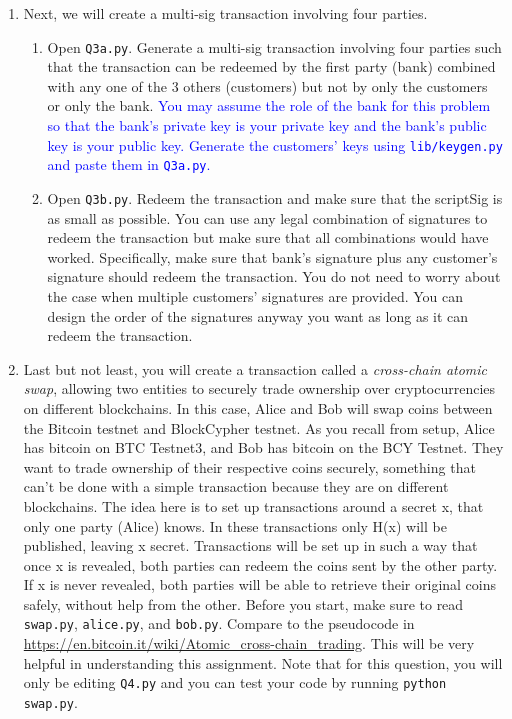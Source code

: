 \documentclass[11pt]{article}
\newenvironment{problems}
{\begin{enumerate}[label=\bfseries Exercise \arabic*.,align=left]}
{\end{enumerate}}
\begin{document}
\begin{problems}
\item Next, we will create a multi-sig transaction involving four parties.
    \begin{enumerate}
        \item Open \texttt{Q3a.py}. Generate a multi-sig transaction involving four parties such that the transaction can be redeemed by the first party (bank) combined with any one of the 3 others (customers) but not by only the customers or only the bank. \textcolor{blue}{You may assume the role of the bank for this problem so that the bank's private key is your private key and the bank's public key is your public key. Generate the customers' keys using \texttt{lib/keygen.py} and paste them in \texttt{Q3a.py}.}
        \item Open \texttt{Q3b.py}. Redeem the transaction and make sure that the scriptSig is as small as possible. You can use any legal combination of signatures to redeem the transaction but make sure that all combinations would have worked. Specifically, make sure that bank’s signature plus any customer’s signature should redeem the transaction. You do not need to worry about the case when multiple customers' signatures are provided. You can design the order of the signatures anyway you want as long as it can redeem the transaction. 
    \end{enumerate}

\item Last but not least, you will create a transaction called a {\it cross-chain atomic swap}, allowing two entities to securely trade ownership over cryptocurrencies on different blockchains. In this case, Alice and Bob will swap coins between the Bitcoin testnet and BlockCypher testnet. As you recall from setup, Alice has bitcoin on BTC Testnet3, and Bob has bitcoin on the BCY Testnet. They want to trade ownership of their respective coins securely, something that can't be done with a simple transaction because they are on different blockchains. The idea here is to set up transactions around a secret x, that only one party (Alice) knows. In these transactions only H(x) will be published, leaving x secret. Transactions will be set up in such a way that once x is revealed, both parties can redeem the coins sent by the other party. If x is never revealed, both parties will be able to retrieve their original coins safely, without help from the other. Before you start, make sure to read \texttt{swap.py}, \texttt{alice.py}, and \texttt{bob.py}. Compare to the pseudocode in \href{https://en.bitcoin.it/wiki/Atomic\_cross-chain\_trading}{https://en.bitcoin.it/wiki/Atomic\_cross-chain\_trading}. This will be very helpful in understanding this assignment. Note that for this question, you will only be editing \texttt{Q4.py} and you can test your code by running \texttt{python swap.py}.


\end{problems}
\end{document}
